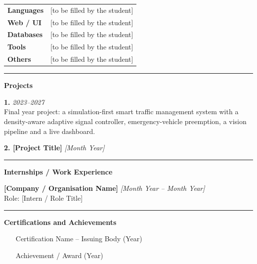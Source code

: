 \begin{tabular}{@{}p{3.5cm}p{9cm}@{}}
\textbf{Languages}   & [to be filled by the student] \\[3pt]
\textbf{Web / UI}    & [to be filled by the student] \\[3pt]
\textbf{Databases}   & [to be filled by the student] \\[3pt]
\textbf{Tools}       & [to be filled by the student] \\[3pt]
\textbf{Others}      & [to be filled by the student] \\
\end{tabular}

\vspace{0.4cm}\hrule\vspace{0.4cm}

\noindent\textbf{Projects}
\vspace{0.2cm}

\noindent\textbf{1. \reporttitle} \hfill \textit{2023--2027}\\
Final year project: a simulation-first smart traffic management system with a density-aware adaptive signal controller, emergency-vehicle preemption, a vision pipeline and a live dashboard.

\noindent\textbf{2. [Project Title]} \hfill \textit{[Month Year]}\\
[Brief one-line description of another project.]

\vspace{0.4cm}\hrule\vspace{0.4cm}

\noindent\textbf{Internships / Work Experience}
\vspace{0.2cm}

\noindent\textbf{[Company / Organisation Name]} \hfill \textit{[Month Year -- Month Year]}\\
Role: [Intern / Role Title]\\
[Brief description of work done.]

\vspace{0.4cm}\hrule\vspace{0.4cm}

\noindent\textbf{Certifications and Achievements}
\begin{itemize}\setlength\itemsep{1pt}
  \item [Certification Name -- Issuing Body (Year)]
  \item [Achievement / Award (Year)]
\end{itemize}

